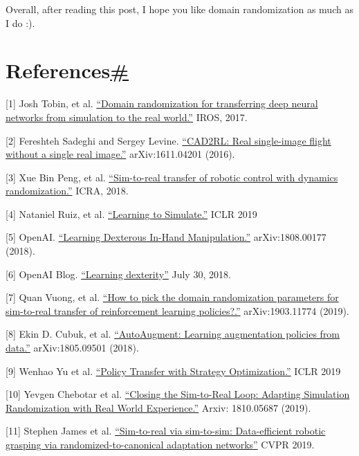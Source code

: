 Overall, after reading this post, I hope you like domain randomization as much as I do :).

\section{\texorpdfstring{References\hyperref[references]{\#}}{References\#}}\label{references}

{[}1{]} Josh Tobin, et al. \href{https://arxiv.org/pdf/1703.06907.pdf}{``Domain randomization for transferring deep neural networks from simulation to the real world.''} IROS, 2017.

{[}2{]} Fereshteh Sadeghi and Sergey Levine. \href{https://arxiv.org/abs/1611.04201}{``CAD2RL: Real single-image flight without a single real image.''} arXiv:1611.04201 (2016).

{[}3{]} Xue Bin Peng, et al. \href{https://arxiv.org/abs/1710.06537}{``Sim-to-real transfer of robotic control with dynamics randomization.''} ICRA, 2018.

{[}4{]} Nataniel Ruiz, et al. \href{https://openreview.net/forum?id=HJgkx2Aqt7}{``Learning to Simulate.''} ICLR 2019

{[}5{]} OpenAI. \href{https://arxiv.org/abs/1808.00177}{``Learning Dexterous In-Hand Manipulation.''} arXiv:1808.00177 (2018).

{[}6{]} OpenAI Blog. \href{https://openai.com/blog/learning-dexterity/}{``Learning dexterity''} July 30, 2018.

{[}7{]} Quan Vuong, et al. \href{https://arxiv.org/abs/1903.11774}{``How to pick the domain randomization parameters for sim-to-real transfer of reinforcement learning policies?.''} arXiv:1903.11774 (2019).

{[}8{]} Ekin D. Cubuk, et al. \href{https://arxiv.org/abs/1805.09501}{``AutoAugment: Learning augmentation policies from data.''} arXiv:1805.09501 (2018).

{[}9{]} Wenhao Yu et al. \href{https://openreview.net/forum?id=H1g6osRcFQ}{``Policy Transfer with Strategy Optimization.''} ICLR 2019

{[}10{]} Yevgen Chebotar et al. \href{https://arxiv.org/abs/1810.05687}{``Closing the Sim-to-Real Loop: Adapting Simulation Randomization with Real World Experience.''} Arxiv: 1810.05687 (2019).

{[}11{]} Stephen James et al. \href{https://arxiv.org/abs/1812.07252}{``Sim-to-real via sim-to-sim: Data-efficient robotic grasping via randomized-to-canonical adaptation networks''} CVPR 2019.

